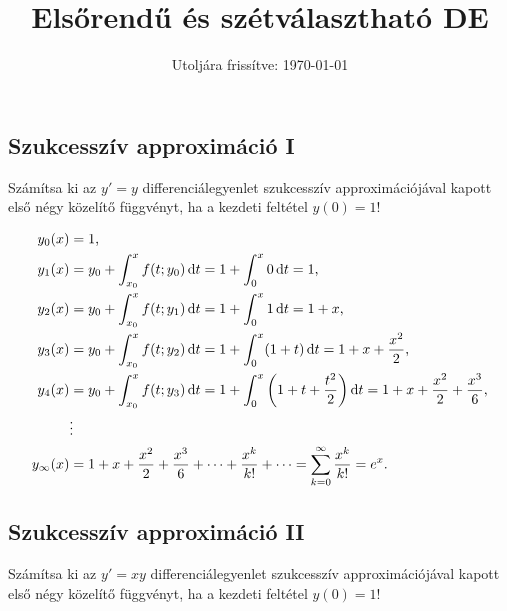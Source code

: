 \documentclass{szb-solution}
\title{Elsőrendű és szétválasztható DE}
\date{Utoljára frissítve: \today}
\begin{document}
\maketitle

\clearpage

\subsection{Szukcesszív approximáció I}

Számítsa ki az $y' = y$ differenciálegyenlet szukcesszív approximációjával
kapott első négy közelítő függvényt, ha a kezdeti feltétel $y(0) = 1$!

\begin{align*}
  y_0(x)        & = 1 \text,
  \\
  y_1(x)        & = y_0 + \int_{x_0}^x f(t; y_0) \dd t
  = 1 + \int_0^x 0 \dd t = 1 \text,
  \\
  y_2(x)        & = y_0 + \int_{x_0}^x f(t; y_1) \dd t
  = 1 + \int_0^x 1 \dd t = 1 + x \text,
  \\
  y_3(x)        & = y_0 + \int_{x_0}^x f(t; y_2) \dd t
  = 1 + \int_0^x (1 + t) \dd t = 1 + x + \frac{x^2}{2} \text,
  \\
  y_4(x)        & = y_0 + \int_{x_0}^x f(t; y_3) \dd t
  = 1 + \int_0^x \left( 1 + t + \frac{t^2}{2} \right) \dd t
  = 1 + x + \frac{x^2}{2} + \frac{x^3}{6} \text,
  \\
                & \vdots
  \\
  y_{\infty}(x) & = 1 + x + \frac{x^2}{2} + \frac{x^3}{6} + \cdots
  + \frac{x^k}{k!} + \cdots
  = \sum_{k=0}^{\infty} \frac{x^k}{k!} = e^x \text.
\end{align*}



\subsection{Szukcesszív approximáció II}

Számítsa ki az $y' = xy$ differenciálegyenlet szukcesszív approximációjával
kapott első négy közelítő függvényt, ha a kezdeti feltétel $y(0) = 1$!
\end{document}

